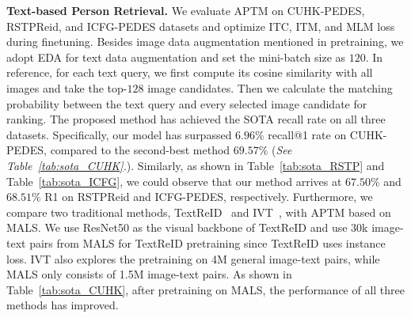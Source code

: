 \documentclass[sigconf]{acmart}
\begin{document}
\noindent\textbf{Text-based Person Retrieval.}
We evaluate APTM on CUHK-PEDES, RSTPReid, and ICFG-PEDES datasets and optimize ITC, ITM, and MLM loss during finetuning. 
Besides image data augmentation mentioned in pretraining, we adopt EDA\cite{wei2019eda} for text data augmentation and set the mini-batch size as $120$.
In reference, for each text query, we first compute its cosine similarity with all images and take the top-$128$ image candidates. Then we calculate the matching probability between the text query and every selected image candidate for ranking.
The proposed method has achieved the SOTA recall rate on all three datasets. Specifically, our model has surpassed $6.96 \%$ recall@1 rate on CUHK-PEDES, compared to the second-best method $69.57 \%$ (\emph{See Table~\ref{tab:sota_CUHK}.}). 
Similarly, as shown in Table~\ref{tab:sota_RSTP} and Table~\ref{tab:sota_ICFG}, we could observe that our method arrives at $67.50 \%$ and $68.51 \%$ R1 on RSTPReid and ICFG-PEDES, respectively.
Furthermore, we compare two traditional methods, TextReID~\cite{han2021text} and IVT~\cite{shu2023see}, with APTM based on MALS. We use ResNet50 as the visual backbone of TextReID and use 30k image-text pairs from MALS for TextReID pretraining since TextReID uses instance loss. IVT also explores the pretraining on 4M general image-text pairs, while MALS only consists of 1.5M image-text pairs.
As shown in Table~\ref{tab:sota_CUHK}, after pretraining on MALS, the performance of all three methods has improved.
\end{document}
